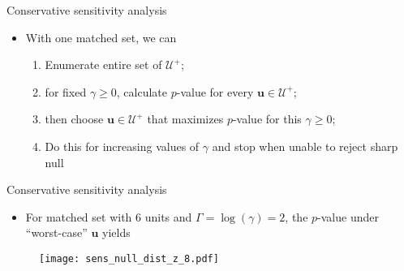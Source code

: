 \documentclass[table, xcolor={dvipsnames}, 9pt]{beamer}
\theoremstyle{newstyle}
\begin{document}
\begin{frame}{Conservative sensitivity analysis}
\vfill
\begin{itemize} \vfill
\item With one matched set, we can \vfill
\begin{enumerate} \vfill
\item Enumerate entire set of $\mathcal{U}^+$; \vfill
\item for fixed $\gamma \geq 0$, calculate $p$-value for every $\bm{u} \in \mathcal{U}^+$; \vfill
\item then choose $\bm{u} \in \mathcal{U}^+$ that maximizes $p$-value for this $\gamma \geq 0$; \vfill
\item Do this for increasing values of $\gamma$ and stop when unable to reject sharp null \vfill
\end{enumerate} \vfill
\end{itemize} \vfill
\end{frame}
\begin{frame}{Conservative sensitivity analysis}
\vfill
\begin{itemize} \vfill
\item For matched set with $6$ units and $\Gamma = \log(\gamma) = 2$, the $p$-value under ``worst-case'' $\bm{u}$ yields
\end{itemize} \vfill
\begin{figure}[H]
\texttt{[image: sens\_null\_dist\_z\_8.pdf]}
\end{figure} \vfill
\end{frame}
\end{document}
